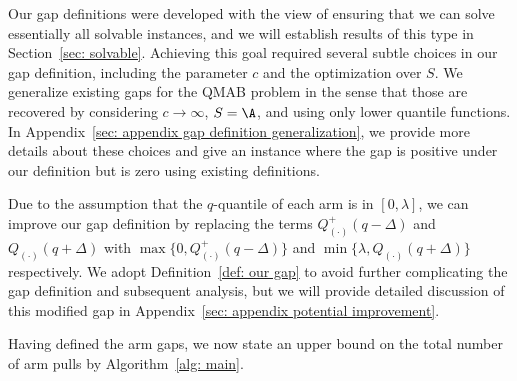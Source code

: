     
\begin{remark}
    \label{rem: gap generalization}
    Our gap definitions were developed with the view of ensuring that we can solve essentially all solvable instances, and we will establish results of this type in Section~\ref{sec: solvable}.  Achieving this goal required several subtle choices in our gap definition, including the parameter $c$ and the optimization over $S$.
    We generalize existing gaps for the QMAB problem in the sense that those are recovered by considering $c \to \infty$, $S = \A$, and using only lower quantile functions. In Appendix~\ref{sec: appendix gap definition generalization}, we provide more details about these choices and give an instance where the gap is positive under our definition but is zero using existing definitions.
\end{remark}

\begin{remark}
    \label{rem: further improvement}
     Due to the assumption that the $q$-quantile of each arm is in $[0, \lambda]$, we can improve our gap definition by replacing the terms $Q^+_{(\cdot)}(q - \Delta)$ and  $Q_{(\cdot)}(q + \Delta)$
    with $\max\big\{0, Q^+_{(\cdot)}(q - \Delta)\big\}$
    and $\min\big\{\lambda, Q_{(\cdot)}(q + \Delta)\big\}$ respectively.  
    We adopt Definition~\ref{def: our gap} to avoid further complicating the gap definition and subsequent analysis, but we will provide detailed discussion of this modified gap in Appendix~\ref{sec: appendix potential improvement}.
\end{remark}




Having defined the arm gaps, we now state an upper bound on the total number of arm pulls by Algorithm~\ref{alg: main}.

